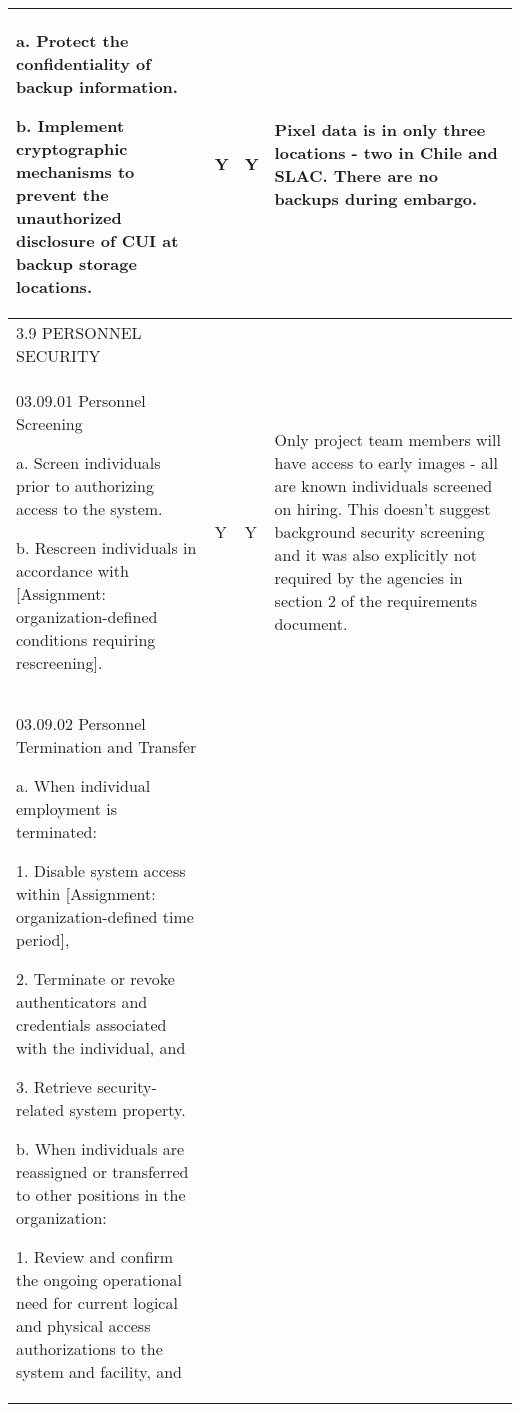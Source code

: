 \begin{longtable} {|p{}|p{}|p{}|p{} |}
{a. Protect the confidentiality of backup information.

b. Implement cryptographic mechanisms to prevent the unauthorized disclosure of CUI at backup storage locations.}&{Y}&{Y}&{Pixel data is in only three locations - two in Chile and SLAC. There are no backups during embargo.} \\ \hline
{3.9 PERSONNEL SECURITY}&&& \\ \hline
{03.09.01 Personnel Screening

a. Screen individuals prior to authorizing access to the system.

b. Rescreen individuals in accordance with [Assignment: organization-defined conditions requiring rescreening].}&{Y}&{Y}&{Only project team members will have access to early images - all are known individuals screened on hiring. This doesn't suggest background security screening and it was also explicitly not required by the agencies in section 2 of the requirements document. } \\ \hline
{03.09.02 Personnel Termination and Transfer

a. When individual employment is terminated:

1. Disable system access within [Assignment: organization-defined time period],

2. Terminate or revoke authenticators and credentials associated with the individual, and

3. Retrieve security-related system property.

b. When individuals are reassigned or transferred to other positions in the organization:

1. Review and confirm the ongoing operational need for current logical and physical access authorizations to the system and facility, and

}
\end{longtable}
